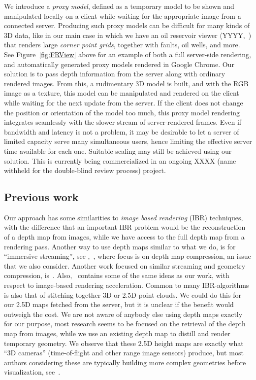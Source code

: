 We introduce a {\em proxy model}, defined as a temporary model to be shown and
manipulated locally on a client while waiting for the appropriate image from a
connected server. Producing such proxy models can be difficult for many kinds of
3D data, like in our main case in which we have an oil reservoir viewer
(YYYY,~\cite{cloudviz}) that renders large {\em corner point grids}, together
with faults, oil wells, and more. See Figure~\ref{fig:FRView} above for an
example of both a full server-side rendering, and automatically generated proxy
models rendered in Google Chrome.
%
Our solution is to pass depth information from the server along with ordinary
rendered images. From this, a rudimentary 3D model is built, and with the RGB
image as a texture, this model can be manipulated and rendered on the client
while waiting for the next update from the server. If the client does not change
the position or orientation of the model too much, this proxy model rendering
integrates seamlessly with the slower stream of server-rendered frames.
%
Even if bandwidth and latency is not a problem, it may be desirable to let a
server of limited capacity serve many simultaneous users, hence limiting the
effective server time available for each one. Suitable scaling may still be
achieved using our solution. This is currently being commercialized in an
ongoing XXXX (name withheld for the double-blind review process) project.


\subsection{Previous work}
\label{sec:prevWork}

Our approach has some similarities to {\em image based rendering} (IBR)
techniques, with the difference that an important IBR problem would be the
reconstruction of a depth map from images, while we have access to the full
depth map from a rendering pass.  Another way to use depth maps similar to what
we do, is for ``immersive streaming'', see \eg,~\cite{ibr}, where focus is on
depth map compression, an issue that we also consider. Another work
focused on similar streaming and geometry compression,
is~\cite{teler}. Also,~\cite{220764} contains some of the same ideas as our
work, with respect to image-based rendering acceleration.
%
Common to many IBR-algorithms is also that of stitching together 3D or 2.5D
point clouds. We could do this for our 2.5D maps fetched from the server, but it
is unclear if the benefit would outweigh the cost.
%
We are not aware of anybody else using depth maps exactly for our purpose, most
research seems to be focused on the retrieval of the depth map from images,
while we use an existing depth map to distill and render temporary geometry.
%
We observe that these 2.5D height maps are exactly what ``3D cameras''
(time-of-flight and other range image sensors) produce, but most authors
considering these are typically building more complex geometries before
visualization, see~\cite{IMM2009-05801}.


